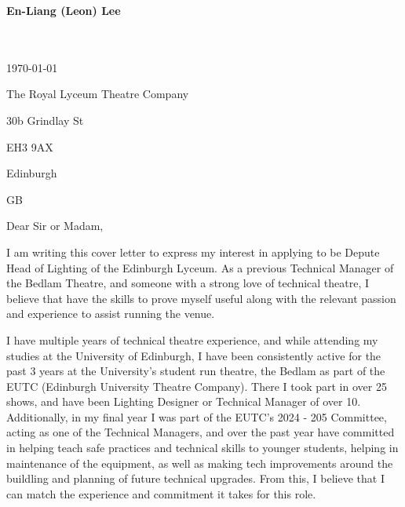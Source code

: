 \documentclass[10pt,english]{article}
\begin{document}
\setlength{\columnsep}{2.2em}
\setlength{\columnseprule}{4pt}



\newpage

\setlength{\columnsep}{2.2em}
\setlength{\columnseprule}{4pt}

\begin{minipage}[c][2.5cm][c]{1\mpwidth}
	\LARGE{\textbf{\textcolor{maincol}{En-Liang (Leon) Lee}}} \\[2pt]
	\normalsize{}\\
	\\
\end{minipage}

\bigskip

\begin{minipage}[c][2.5cm][c]{1\mpwidth}
	\today
	\bigskip

	The Royal Lyceum Theatre Company

	30b Grindlay St

	EH3 9AX

	Edinburgh 

	GB
\end{minipage}
\bigskip\bigskip

Dear Sir or Madam,
\medskip

I am writing this cover letter to express my interest in applying to be Depute Head of Lighting of the Edinburgh Lyceum. As a previous Technical Manager of the Bedlam Theatre, and someone with a strong love of technical theatre, I believe that have the skills to prove myself useful along with the relevant passion and experience to assist running the venue.

\medskip

I have multiple years of technical theatre experience, and while attending my studies at the University of Edinburgh, I have been consistently active for the past 3 years at the University's student run theatre, the Bedlam as part of the EUTC (Edinburgh University Theatre Company). There I took part in over 25 shows, and have been Lighting Designer or Technical Manager of over 10. Additionally, in my final year I was part of the EUTC's 2024 - 205 Committee, acting as one of the Technical Managers, and over the past year have committed in helping teach safe practices and technical skills to younger students, helping in maintenance of the equipment, as well as making tech improvements around the buildling and planning of future technical upgrades. From this, I believe that I can match the experience and commitment it takes for this role. 
\end{document}
